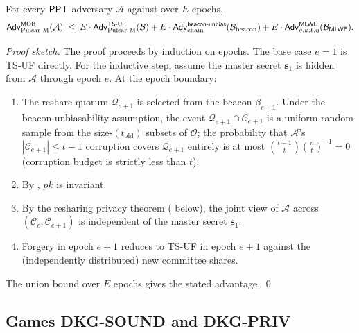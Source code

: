 \begin{theorem}
\label{thm:mob}
For every $\mathsf{PPT}$ adversary $\mathcal{A}$ against  over
$E$ epochs,
\[
\mathsf{Adv}^{\mathsf{MOB}}_{\mathrm{Pulsar\text{-}M}}(\mathcal{A})
\;\le\;
E \cdot \mathsf{Adv}^{\mathsf{TS\textsf{-}UF}}_{\mathrm{Pulsar\text{-}M}}(\mathcal{B})
+ E \cdot \mathsf{Adv}^{\mathsf{beacon\textsf{-}unbias}}_{\mathrm{chain}}(\mathcal{B}_{\mathrm{beacon}}) +
E \cdot \mathsf{Adv}^{\mathsf{MLWE}}_{q, k, \ell, \eta}(\mathcal{B}_{\mathsf{MLWE}}).
\]
\end{theorem}

\begin{proof}[Proof sketch]
The proof proceeds by induction on epochs. The base case $e = 1$ is
TS-UF directly. For the inductive step, assume the master secret
$\mathbf{s}_1$ is hidden from $\mathcal{A}$ through epoch $e$. At the
epoch boundary:
\begin{enumerate}[leftmargin=*, itemsep=0pt]
\item The reshare quorum $\mathcal{Q}_{e+1}$ is selected from the
beacon $\beta_{e+1}$. Under the beacon-unbiasability assumption, the
event \(\mathcal{Q}_{e+1} \cap \mathcal{C}_{e+1}\) is a uniform random
sample from the size-$(t_{\mathrm{old}})$ subsets of $\mathcal{O}$;
the probability that $\mathcal{A}$'s
$|\mathcal{C}_{e+1}| \le t-1$ corruption covers $\mathcal{Q}_{e+1}$ entirely
is at most
$\binom{t-1}{t}\binom{n}{t}^{-1} = 0$ (corruption budget is strictly less than $t$).
\item By , $\mathit{pk}$ is invariant.
\item By the resharing privacy theorem
( below), the joint view of $\mathcal{A}$
across $(\mathcal{C}_e, \mathcal{C}_{e+1})$ is independent of the
master secret $\mathbf{s}_1$.
\item Forgery in epoch $e+1$ reduces to TS-UF in epoch $e+1$ against
the (independently distributed) new committee shares.
\end{enumerate}
The union bound over $E$ epochs gives the stated advantage. \qed
\end{proof}

\subsection{Games DKG-SOUND and DKG-PRIV}
\label{sec:game-dkg}

